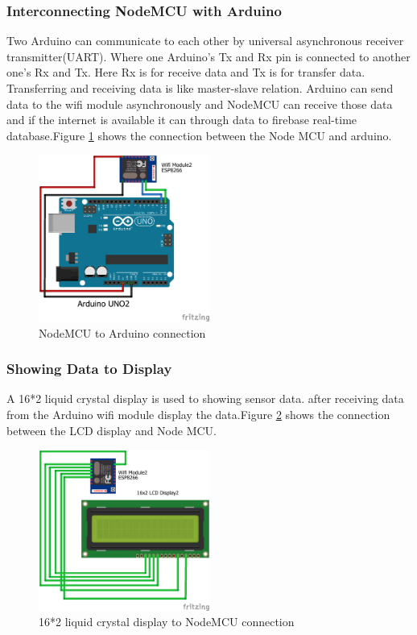 \subsubsection*{Interconnecting NodeMCU with Arduino}
Two Arduino can communicate to each other by universal asynchronous receiver transmitter(UART). Where one Arduino's Tx and Rx pin is connected to another one's Rx and Tx. Here Rx is for receive data and Tx is for transfer data. Transferring and receiving data is like master-slave relation. Arduino can send data to the wifi module asynchronously and NodeMCU can receive those data and if the internet is available it can through data to firebase real-time database.Figure \ref{NodeMCU} shows the connection between the Node MCU and arduino.
\begin{figure}[H]
\centering
\includegraphics[width=0.5\textwidth]{figures/wifi_bb.png}
\caption{NodeMCU to Arduino connection}
\label{NodeMCU}
\end{figure}
\subsubsection*{Showing Data to Display}
A 16*2 liquid crystal display is used to showing sensor data. after receiving data from the Arduino wifi module display the data.Figure \ref{LCD} shows the connection between the LCD display and Node MCU.
\begin{figure}[H]
\centering
\includegraphics[width=0.5\textwidth]{figures/wifiDisplay_bb.png}
\caption{16*2 liquid crystal display to NodeMCU connection}
\label{LCD}
\end{figure}
